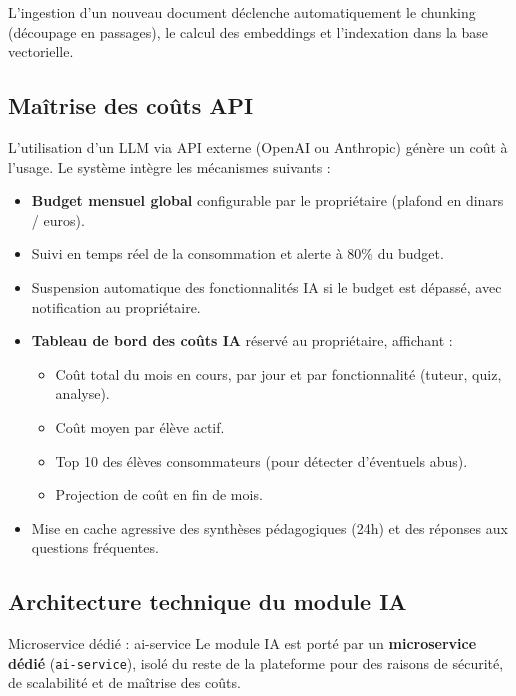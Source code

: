 \documentclass[12pt,a4paper]{article}
\begin{document}
L'ingestion d'un nouveau document déclenche automatiquement le chunking (découpage en passages), le calcul des embeddings et l'indexation dans la base vectorielle.

\subsection{Maîtrise des coûts API}

L'utilisation d'un LLM via API externe (OpenAI ou Anthropic) génère un coût à l'usage. Le système intègre les mécanismes suivants :

\begin{itemize}[leftmargin=*,itemsep=4pt]
    \item \textbf{Budget mensuel global} configurable par le propriétaire (plafond en dinars / euros).
    \item Suivi en temps réel de la consommation et alerte à 80\% du budget.
    \item Suspension automatique des fonctionnalités IA si le budget est dépassé, avec notification au propriétaire.
    \item \textbf{Tableau de bord des coûts IA} réservé au propriétaire, affichant :
    \begin{itemize}
        \item Coût total du mois en cours, par jour et par fonctionnalité (tuteur, quiz, analyse).
        \item Coût moyen par élève actif.
        \item Top 10 des élèves consommateurs (pour détecter d'éventuels abus).
        \item Projection de coût en fin de mois.
    \end{itemize}
    \item Mise en cache agressive des synthèses pédagogiques (24h) et des réponses aux questions fréquentes.
\end{itemize}

\subsection{Architecture technique du module IA}

\begin{infobox}{Microservice dédié : ai-service}
Le module IA est porté par un \textbf{microservice dédié} (\texttt{ai-service}), isolé du reste de la plateforme pour des raisons de sécurité, de scalabilité et de maîtrise des coûts.
\end{infobox}
\end{document}
